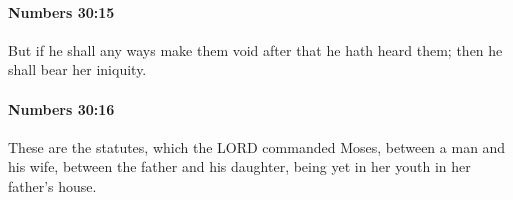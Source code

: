 		\paragraph{Numbers 30:15} %
			\label{NUMBERS-30-15}

			But if he shall any ways make them void after that he hath heard them; then he shall bear her iniquity.


		\paragraph{Numbers 30:16} %
			\label{NUMBERS-30-16}

			These are the statutes, which the LORD commanded Moses, between a man and his wife, between the father and his daughter, being yet in her youth in her father’s house.

